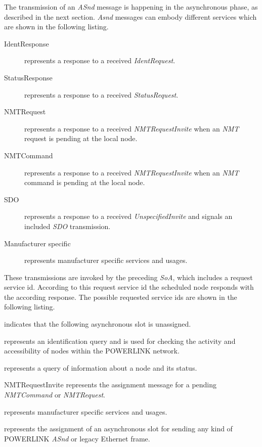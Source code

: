 The transmission of an \emph{ASnd} message is happening in the asynchronous phase, as described in the next section.
\emph{Asnd} messages can embody different services which are shown in the following listing. \cite[section 4.6.1.1.6.1]{epsg_epsg_2013}

\begin{description}
    \item[IdentResponse] represents a response to a received \emph{IdentRequest}.
    \item[StatusResponse] represents a response to a received \emph{StatusRequest}.
    \item[NMTRequest] represents a response to a received \emph{NMTRequestInvite} when an \emph{NMT} request is pending at the local node.
    \item[NMTCommand] represents a response to a received \emph{NMTRequestInvite} when an \emph{NMT} command is pending at the local node.
    \item[SDO] represents a response to a received \emph{UnspecifiedInvite} and signals an included \emph{SDO} transmission.
    \item[Manufacturer specific] represents manufacturer specific services and usages.
\end{description}

These transmissions are invoked by the preceding \emph{SoA}, which includes a request service id.
According to this request service id the scheduled node responds with the according response.
The possible requested service ids are shown in the following listing. \cite[section 4.6.1.1.5.1]{epsg_epsg_2013}

\begin{description}
    \item[NoService] indicates that the following asynchronous slot is unassigned.
    \item[IdentRequest] represents an identification query and is used for checking the activity and accessibility of nodes within the POWERLINK network.
    \item[StatusRequest] represents a query of information about a node and its status.
    \begin{sloppypar}
    \item[NMTRequestInvite] represents the assignment message for a pending \mbox{\emph{NMTCommand}} or \emph{NMTRequest}.
    \end{sloppypar}
    \item[Manufacturer specific] represents manufacturer specific services and usages.
    \item[UnspecifiedInvite] represents the assignment of an asynchronous slot for sending any kind of POWERLINK \emph{ASnd} or legacy Ethernet frame.
\end{description}


